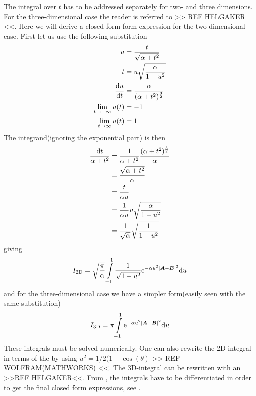     The integral over $t$ has to be addressed separately for two- and three
    dimensions. For the three-dimensional case the reader is referred to >> REF
    HELGAKER <<. Here we will derive a closed-form form expression for the
    two-dimensional case. First let us use the following substitution
        \begin{equation}
            \begin{aligned}
                u &= \frac{t}{\sqrt{\alpha+t^2}} \\
                t &= u\sqrt{\frac{\alpha}{1-u^2}} \\
                \frac{\mathrm{d} u}{\mathrm{d} t} &= \frac{\alpha}{(\alpha + t^2)^{\frac{3}{2}}} \\
                \lim\limits_{t\rightarrow -\infty} u(t) &= -1 \\
                \lim\limits_{t\rightarrow \infty} u(t) &= 1 \\
            \end{aligned}
            \label{eq:uSubs1}
        \end{equation}
    The integrand(ignoring the exponential part) is then
        \begin{align}
            \frac{\mathrm{d} t}{\alpha + t^2} &= \frac{1}{\alpha + t^2} \frac{(\alpha +
            t^2)^{\frac{3}{2}}}{\alpha} \nonumber \\
            &= \frac{\sqrt{\alpha + t^2}}{\alpha} \nonumber \\
            &= \frac{t}{\alpha u} \nonumber \\
            &= \frac{1}{\alpha u} u\sqrt{\frac{\alpha}{1-u^2}} \nonumber \\
            &= \frac{1}{\sqrt{\alpha}}\sqrt{\frac{1}{1-u^2}}
        \end{align}
    giving
        \begin{align}
            I_{\text{2D}} = \sqrt{\frac{\pi}{\alpha}}\int\limits^1_{-1}
            \frac{1}{\sqrt{1-u^2}} \mathrm{e}^{-\alpha u^2\abs{\boldsymbol{{A}} - \boldsymbol{{B}}}^2}
            \mathrm{d} u
            \label{eq:oneElectron2D}
        \end{align}
    and for the three-dimensional case we have a simpler form(easily seen with
    the same substitution)
        \begin{align}
            I_{\text{3D}} = \pi\int\limits^1_{-1} \mathrm{e}^{-\alpha u^2\abs{\boldsymbol{{A}}
            - \boldsymbol{{B}}}^2} \mathrm{d} u
            \label{eq:oneElectron3D}
        \end{align}
    These integrals must be solved numerically. One can also rewrite the
    2D-integral in terms of the 
    by using $u^2=1/2(1 - \cos(\theta)$ >> REF WOLFRAM(MATHWORKS) <<. The
    3D-integral can be rewritten with an 
    >>REF HELGAKER<<. From , the integrals have to be
    differentiated in order to get the final closed form expressions, see
    .

